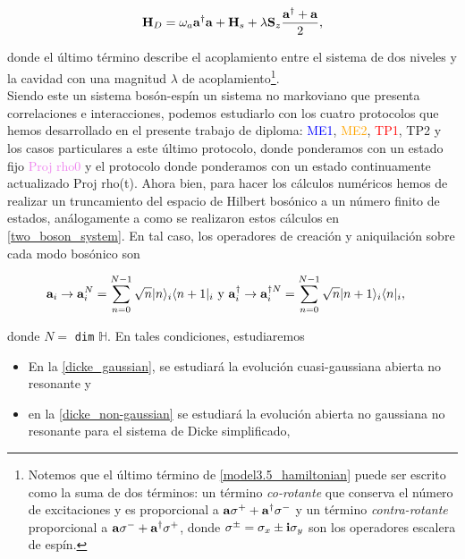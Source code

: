 \documentclass{report} %
\numberwithin{equation}{section}
\begin{document}
\begin{equation}
    \mathbf{H}_D = \omega_a {\bf a}^{\dagger}{\bf a} + {\bf H}_s+ \lambda {\bf S}_z \frac{{\bf a}^{\dagger}+{\bf a}}{2},
    \label{model3.5_hamiltonian}
\end{equation}

donde el último término describe el acoplamiento entre el sistema de dos niveles y la cavidad con una magnitud $\lambda$ de acoplamiento\footnote{
Notemos que el último término de \eqref{model3.5_hamiltonian} puede ser escrito como la suma de dos términos: un término \textit{co-rotante} que conserva el número de excitaciones y es proporcional a ${\bf a}\sigma^{+} + {\bf a}^{\dagger}\sigma^{-}$ y un término \textit{contra-rotante} proporcional a ${\bf a}\sigma^{-} + {\bf a}^{\dagger}\sigma^{+}$, donde $\sigma^{\pm}=\sigma_{x}\pm {\bf i}\sigma_{y}$ son los operadores escalera de espín.}. \\

Siendo este un sistema bosón-espín un sistema no markoviano que presenta correlaciones e interacciones, podemos estudiarlo con los cuatro protocolos que hemos desarrollado en el presente trabajo de diploma: \textcolor{blue}{ME1}, \textcolor{orange}{ME2}, \textcolor{red}{TP1}, \textcolor{dark green}{TP2} y los casos particulares a este último protocolo, donde ponderamos con un estado fijo \textcolor{violet}{Proj rho0} y el protocolo donde ponderamos con un estado continuamente actualizado \textcolor{awesome}{Proj rho(t)}.
Ahora bien, para hacer los cálculos numéricos hemos de realizar un truncamiento del espacio de Hilbert bosónico a un número finito de estados, análogamente a como se realizaron estos cálculos en \autoref{two_boson_system}. En tal caso, los operadores de creación y aniquilación sobre cada modo bosónico son

\begin{subequations}
\begin{align}
{\bf a}_{i}\rightarrow {\bf a}^{N}_{i}=\sum_{n=0}^{N-1}\sqrt{n}|n\rangle_i \langle n+1|_i & \textnormal{ y }{\bf a}^{\dagger}_{i}\rightarrow {\bf a}^{\dagger N}_{i}=\sum_{n=0}^{N-1}\sqrt{n}|n+1\rangle_i \langle n|_i,
\end{align}
\end{subequations}

donde $N =$ \texttt{dim} $\mathds{H}$. En tales condiciones, estudiaremos

\begin{itemize}
    \item En la \autoref{dicke_gaussian}, se estudiará la evolución cuasi-gaussiana abierta no resonante y 
    \item en la \autoref{dicke_non-gaussian} se estudiará la evolución abierta no gaussiana no resonante para el sistema de Dicke simplificado,
\end{itemize}
\end{document}
